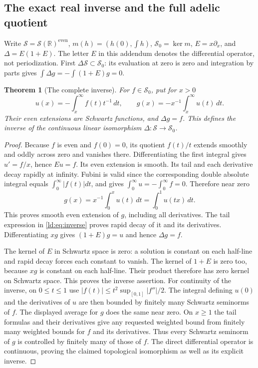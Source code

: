 \documentclass[11pt,a4paper]{article}
\newtheorem{theorem}{Theorem}[section]
\theoremstyle{definition}\newtheorem{definition}[theorem]{Definition}
\begin{document}
\subsection{The exact real inverse and the full adelic quotient}

Write $\mathscr S=\mathcal S(\mathbb R)^{\mathrm{even}}$,
$m(h)=(h(0),\int h)$, $\mathscr S_0=\ker m$,
$E=x\partial_x$, and $\Delta=E(1+E)$. The letter $E$ in
this addendum denotes the differential operator, not periodization.
First $\Delta\mathscr S\subset\mathscr S_0$: its evaluation at
zero is zero and integration by parts gives
$\int\Delta g=-\int(1+E)g=0$.

\begin{theorem}[The complete inverse]
For $f\in\mathscr S_0$, put for $x>0$
\[
 u(x)=-\int_x^\infty f(t)t^{-1}\,dt,
 \qquad g(x)=-x^{-1}\int_x^\infty u(t)\,dt.
 \tag{LD1}\label{ld:eq:inverse}
\]
Their even extensions are Schwartz functions, and $\Delta g=f$.
This defines the inverse of the continuous linear isomorphism
$\Delta:\mathscr S\to\mathscr S_0$.
\end{theorem}
\begin{proof}
Because $f$ is even and $f(0)=0$, its quotient $f(t)/t$ extends
smoothly and oddly across zero and vanishes there. Differentiating
the first integral gives $u'=f/x$, hence $Eu=f$. Its even extension
is smooth. Its tail and each derivative decay rapidly at infinity.
Fubini is valid since the corresponding double absolute integral
equals $\int_0^\infty|f(t)|dt$, and gives
$\int_0^\infty u=-\int_0^\infty f=0$. Therefore near zero
\[
 g(x)=x^{-1}\int_0^xu(t)\,dt=\int_0^1u(tx)\,dt.
\]
This proves smooth even extension of $g$, including all derivatives.
The tail expression in \eqref{ld:eq:inverse} proves rapid decay of
it and its derivatives. Differentiating $xg$ gives
$(1+E)g=u$ and hence $\Delta g=f$.

The kernel of $E$ in Schwartz space is zero: a solution is constant
on each half-line and rapid decay forces each constant to vanish.
The kernel of $1+E$ is zero too, because $xg$ is constant on each
half-line. Their product therefore has zero kernel on Schwartz
space. This proves the inverse assertion.
For continuity of the inverse, on $0\le t\le1$ use
$|f(t)|\le t^2\sup_{[0,1]}|f''|/2$. The integral defining
$u(0)$ and the derivatives of $u$ are then bounded by finitely
many Schwartz seminorms of $f$. The displayed average for $g$
does the same near zero. On $x\ge1$ the tail formulas and their
derivatives give any requested weighted bound from finitely many
weighted bounds for $f$ and its derivatives. Thus every Schwartz
seminorm of $g$ is controlled by finitely many of those of $f$.
The direct differential operator is continuous, proving the
claimed topological isomorphism as well as its explicit inverse.
\end{proof}
\end{document}
